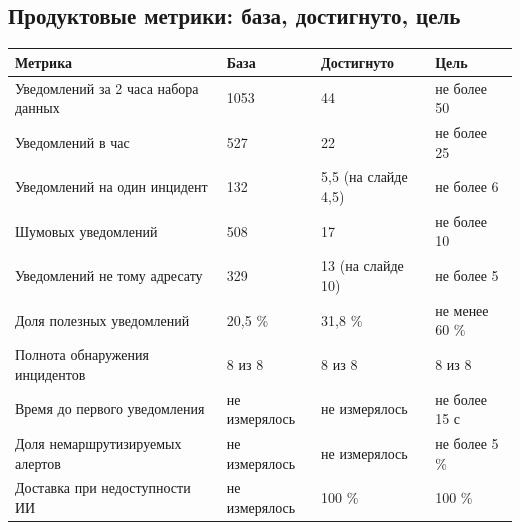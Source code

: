 \documentclass[11pt]{article}
\begin{document}
\subsection{Продуктовые метрики: база, достигнуто, цель}
\begin{longtable}{|L{5.6cm}|L{2.6cm}|L{2.9cm}|L{2.4cm}|}
\hline
\textbf{Метрика} & \textbf{База} & \textbf{Достигнуто} & \textbf{Цель} \\ \hline
Уведомлений за 2 часа набора данных & 1053 & 44 & не более 50 \\ \hline
Уведомлений в час & 527 & 22 & не более 25 \\ \hline
Уведомлений на один инцидент & 132 & 5,5 (на слайде 4,5) & не более 6 \\ \hline
Шумовых уведомлений & 508 & 17 & не более 10 \\ \hline
Уведомлений не тому адресату & 329 & 13 (на слайде 10) & не более 5 \\ \hline
Доля полезных уведомлений & 20,5 \% & 31,8 \% & не менее 60 \% \\ \hline
Полнота обнаружения инцидентов & 8 из 8 & 8 из 8 & 8 из 8 \\ \hline
Время до первого уведомления & не измерялось & не измерялось & не более 15 с \\ \hline
Доля немаршрутизируемых алертов & не измерялось & не измерялось & не более 5 \% \\ \hline
Доставка при недоступности ИИ & не измерялось & 100 \% & 100 \% \\ \hline
\end{longtable}
\end{document}
